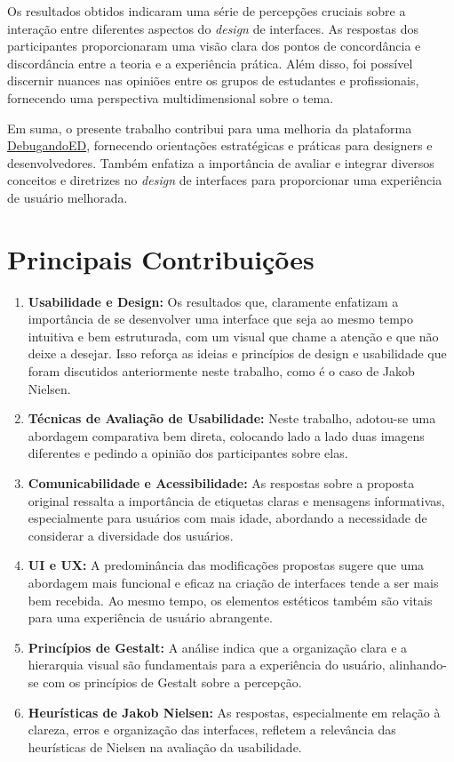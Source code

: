 Os resultados obtidos indicaram uma série de percepções cruciais sobre a interação entre diferentes aspectos do \textit{design} de interfaces. As respostas dos participantes proporcionaram uma visão clara dos pontos de concordância e discordância entre a teoria e a experiência prática. Além disso, foi possível discernir nuances nas opiniões entre os grupos de estudantes e profissionais, fornecendo uma perspectiva multidimensional sobre o tema.

Em suma, o presente trabalho contribui para uma melhoria da plataforma \href{https://debugandoed.facom.ufu.br/}{DebugandoED}, fornecendo orientações estratégicas e práticas para designers e desenvolvedores. Também enfatiza a importância de avaliar e integrar diversos conceitos e diretrizes no \textit{design} de interfaces para proporcionar uma experiência de usuário melhorada.	

\section{Principais Contribuições}
\begin{enumerate}
    \item \textbf{Usabilidade e Design:} Os resultados que, claramente enfatizam a importância de se desenvolver uma interface que seja ao mesmo tempo intuitiva e bem estruturada, com um visual que chame a atenção e que não deixe a desejar. Isso reforça as ideias e princípios de design e usabilidade que foram discutidos anteriormente neste trabalho, como é o caso de Jakob Nielsen.
    \item \textbf{Técnicas de Avaliação de Usabilidade:} Neste trabalho, adotou-se uma abordagem comparativa bem direta, colocando lado a lado duas imagens diferentes e pedindo a opinião dos participantes sobre elas.
    \item \textbf{Comunicabilidade e Acessibilidade:} As respostas sobre a proposta original ressalta a importância de etiquetas claras e mensagens informativas, especialmente para usuários com mais idade, abordando a necessidade de considerar a diversidade dos usuários.
    \item \textbf{UI e UX:} A predominância das modificações propostas sugere que uma abordagem mais funcional e eficaz na criação de interfaces tende a ser mais bem recebida. Ao mesmo tempo, os elementos estéticos também são vitais para uma experiência de usuário abrangente.
    \item \textbf{Princípios de Gestalt:} A análise indica que a organização clara e a hierarquia visual são fundamentais para a experiência do usuário, alinhando-se com os princípios de Gestalt sobre a percepção.
    \item \textbf{Heurísticas de Jakob Nielsen:} As respostas, especialmente em relação à clareza, erros e organização das interfaces, refletem a relevância das heurísticas de Nielsen na avaliação da usabilidade.
\end{enumerate}
 
